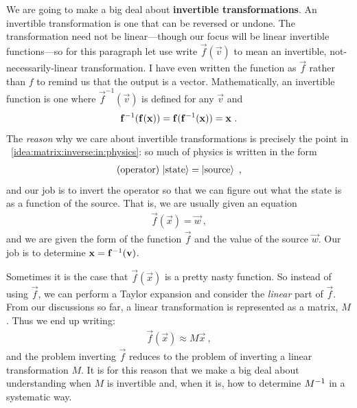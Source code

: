 \documentclass[12pt, oneside]{report}    %
\begin{document}
We are going to make a big deal about \textbf{invertible transformations}. An invertible transformation is one that can be reversed or undone. The transformation need not be linear---though our focus will be linear invertible functions---so for this paragraph let use write $\vec{f}(\vec{v})$ to mean an invertible, not-necessarily-linear transformation. I have even written the function as $\vec{f}$ rather than $f$ to remind us that the output is a vector. Mathematically, an invertible function is one where $\vec{f}^{-1}(\vec{v})$ is defined for any $\vec{v}$ and
\begin{align}
    \mathbf{f}^{-1}(\mathbf{f}(\mathbf{x})) = \mathbf{f}(\mathbf{f}^{-1}(\mathbf{x})) = \mathbf{x} \ .
\end{align}
The \emph{reason} why we care about invertible transformations is precisely the point in \bigidearef~\ref{idea:matrix:inverse:in:physics}: so much of physics is written in the form
\begin{align}
    (\textnormal{operator})\, \left|\textnormal{state}\right\rangle = \left|\textnormal{source}\right\rangle \ ,
\end{align}
and our job is to invert the operator so that we can figure out what the state is as a function of the source. That is, we are usually given an equation
\begin{align}
    \vec{f}(\vec{x}) = \vec{w} \ ,
\end{align}
and we are given the form of the function $\vec{f}$ and the value of the source $\vec{w}$. Our job is to determine $\mathbf{x} = \mathbf{f}^{-1}(\mathbf{v})$. 

Sometimes it is the case that $\vec{f}(\vec{x})$ is a pretty nasty function. So instead of using $\vec{f}$, we can perform a Taylor expansion and consider the \emph{linear} part of $\vec{f}$. From our discussions so far, a linear transformation is represented as a matrix, $M$. Thus we end up writing:
\begin{align}
    \vec{f}(\vec{x}) \approx M\vec{x}  \ ,
\end{align}
and the problem inverting $\vec{f}$ reduces to the problem of inverting a linear transformation $M$. It is for this reason that we make a big deal about understanding when $M$ is invertible and, when it is, how to determine $M^{-1}$ in a systematic way.
\end{document}
